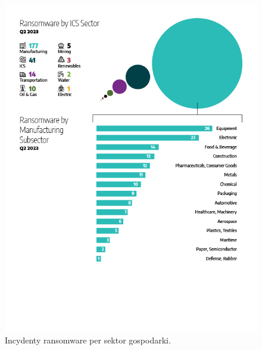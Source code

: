 \begin{figure}[H]
\centering
\includegraphics[width=0.6\linewidth]{rysunki/attackbysector.png}
\caption{Incydenty ransomware per sektor gospodarki\protect\footnotemark. }
\label{fig:enter-label}
\end{figure}


